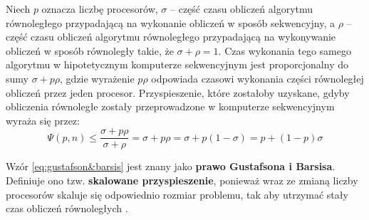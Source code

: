 Niech \(p\) oznacza liczbę procesorów, \(\sigma\) -- część czasu obliczeń algorytmu równoległego przypadającą na wykonanie obliczeń w sposób sekwencyjny, a \(\rho\) -- część czasu obliczeń algorytmu równoległego przypadającą na wykonywanie obliczeń w sposób równoległy takie, że \(\sigma+\rho=1\). Czas wykonania tego samego algorytmu w hipotetycznym komputerze sekwencyjnym jest proporcjonalny do sumy \(\sigma + p\rho\), gdzie wyrażenie \(p\rho\) odpowiada czasowi wykonania części równoległej obliczeń przez jeden procesor. Przyspieszenie, które zostałoby uzyskane, gdyby obliczenia równoległe zostały przeprowadzone w komputerze sekwencyjnym wyraża się przez:
\begin{equation}\label{eq:gustafson&barsis}
\Psi(p,n)\leq\frac{\sigma+p\rho}{\sigma+\rho}=\sigma+p\rho=\sigma+p\left(1-\sigma\right)=p+\left(1-p\right)\sigma
\end{equation}

Wzór \eqref{eq:gustafson&barsis} jest znany jako \textbf{prawo Gustafsona i Barsisa}. Definiuje ono tzw. \textbf{skalowane przyspieszenie}, ponieważ wraz ze zmianą liczby procesorów skaluje się odpowiednio rozmiar problemu, tak aby utrzymać stały czas obliczeń równoległych \cite{Czech}.